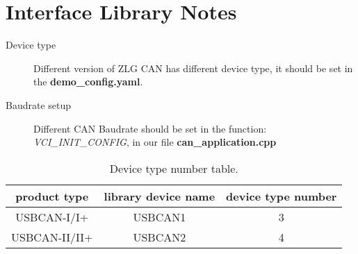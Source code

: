 
\section{Interface Library Notes}
\begin{description}
	\item[Device type] Different version of ZLG CAN has different device type, it should be set in the \textbf{demo\_config.yaml}.
	\item[Baudrate setup] Different CAN Baudrate should be set in the function: \textit{VCI\_INIT\_CONFIG}, in our file \textbf{can\_application.cpp}


\end{description}

\begin{table}[htb!]
	\caption[Device type number table]{Device type number table.}
	\begin{tabular}{ c c c }
		\toprule
		product type & library device name & device type number \\
		\midrule
		USBCAN-I/I+  & USBCAN1  &   3 \\
		\midrule
		USBCAN-II/II+ & USBCAN2 & 4 \\
		\bottomrule
	\end{tabular}
\end{table}

